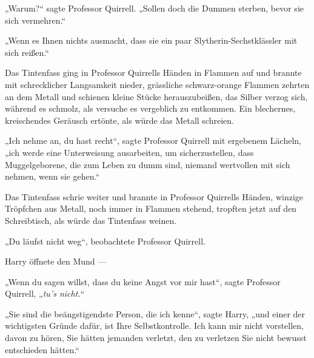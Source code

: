 „Warum?“ sagte Professor Quirrell.
„Sollen doch die Dummen sterben, bevor sie sich vermehren.“

„Wenn es Ihnen nichts ausmacht, dass sie ein paar Slytherin-Sechstklässler mit sich reißen.“

Das Tintenfass ging in Professor Quirrells Händen in Flammen auf und brannte mit schrecklicher Langsamkeit nieder, grässliche schwarz-orange Flammen zehrten an dem Metall und schienen kleine Stücke herauszubeißen, das Silber verzog sich, während es schmolz, als versuche es vergeblich zu entkommen. Ein blechernes, kreischendes Geräusch ertönte, als würde das Metall schreien.

„Ich nehme an, du hast recht“, sagte Professor Quirrell mit ergebenem Lächeln, „ich werde eine Unterweisung ausarbeiten, um sicherzustellen, dass Muggelgeborene, die zum Leben zu dumm sind, niemand wertvollen mit sich nehmen, wenn sie gehen.“

Das Tintenfass schrie weiter und brannte in Professor Quirrells Händen, winzige Tröpfchen aus Metall, noch immer in Flammen stehend, tropften jetzt auf den Schreibtisch, als würde das Tintenfass weinen.

„Du läufst nicht weg“, beobachtete Professor Quirrell.

Harry öffnete den Mund —

„Wenn du sagen willst, dass du keine Angst vor mir hast“, sagte Professor Quirrell,
„\emph{tu’s nicht.}“

„Sie sind die beängstigendste Person, die ich kenne“, sagte Harry, „und einer der wichtigsten Gründe dafür, ist Ihre Selbstkontrolle. Ich kann mir nicht vorstellen, davon zu hören, Sie hätten jemanden verletzt, den zu verletzen Sie nicht bewusst entschieden hätten.“

